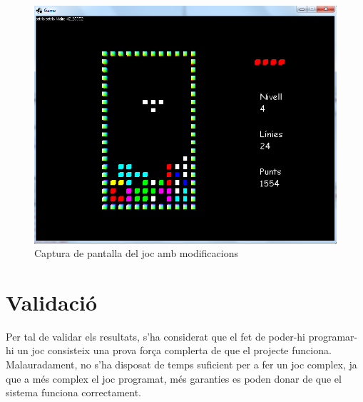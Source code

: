   \begin{figure}
    \centering
    \includegraphics[width=0.5\linewidth]{./img/ImatgePecaSeguent.png}
    \caption{Captura de pantalla del joc amb modificacions \label{fig:ImatgePecaSeguent}}
  \end{figure}
  
  
\section{Validació}

  Per tal de validar els resultats, s'ha considerat que el fet de poder-hi programar-hi un joc consisteix una prova força complerta de que el projecte funciona. Malauradament, no s'ha disposat de temps suficient per a fer un joc complex, ja que a més complex el joc programat, més garanties es poden donar de que el sistema funciona correctament.

  